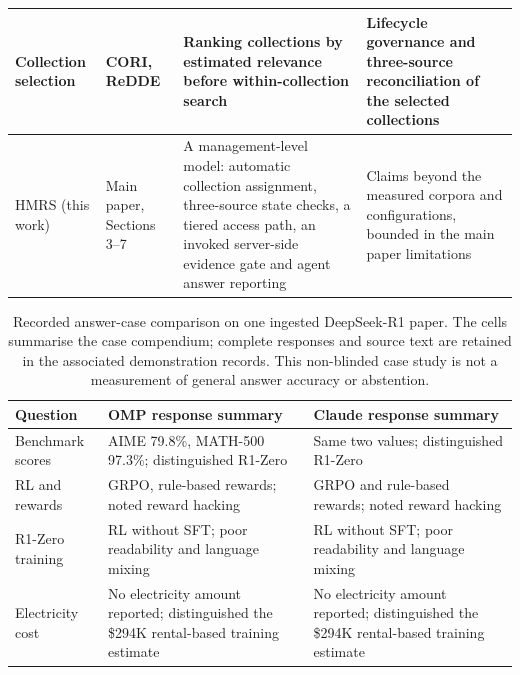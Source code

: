 \documentclass[final,5p,times,twocolumn]{elsarticle}
\begin{document}
\begin{table}[t]
\begin{tabular}{@{}>{\raggedright\arraybackslash}p{}>{\raggedright\arraybackslash}p{}>{\raggedright\arraybackslash}p{}>{\raggedright\arraybackslash}p{}@{}}
Collection selection & CORI, ReDDE & Ranking collections by estimated relevance before within-collection search & Lifecycle governance and three-source reconciliation of the selected collections\\
\midrule
HMRS (this work) & Main paper, Sections 3--7 & A management-level model: automatic collection assignment, three-source state checks, a tiered access path, an invoked server-side evidence gate and agent answer reporting & Claims beyond the measured corpora and configurations, bounded in the main paper limitations\\
\bottomrule
\end{tabular}
\end{table}

\begin{table}[t]
\centering\small
\caption{Recorded answer-case comparison on one ingested DeepSeek-R1 paper.
The cells summarise the case compendium; complete responses and source text
are retained in the associated demonstration records. This non-blinded case
study is not a measurement of general answer accuracy or abstention.}
\label{tab:s-answer-cases}
\begin{tabular}{@{}p{}p{}p{}@{}}
\toprule
Question & OMP response summary & Claude response summary \\
\midrule
Benchmark scores & AIME 79.8\%, MATH-500 97.3\%; distinguished R1-Zero & Same two values; distinguished R1-Zero \\
RL and rewards & GRPO, rule-based rewards; noted reward hacking & GRPO and rule-based rewards; noted reward hacking \\
R1-Zero training & RL without SFT; poor readability and language mixing & RL without SFT; poor readability and language mixing \\
Electricity cost & No electricity amount reported; distinguished the \$294K rental-based training estimate & No electricity amount reported; distinguished the \$294K rental-based training estimate \\
\bottomrule
\end{tabular}
\end{table}
\end{document}
